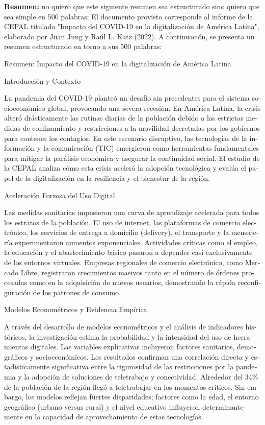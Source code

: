 \documentclass{article}
\begin{document}
\begin{tcolorbox}[colback=brown!8!white,colframe=brown!8!white,boxrule=0pt,arc=2pt,left=4pt,right=4pt,top=3pt,bottom=3pt,before skip=4pt,after skip=4pt]
\begin{otherlanguage}{spanish}
\sffamily\small \textbf{Resumen:} no quiero que este siguiente resumen sea estructurado sino quiero que sea simple en 500 palabras: El documento provisto corresponde al informe de la CEPAL titulado "Impacto del COVID-19 en la digitalización de América Latina", elaborado por Juan Jung y Raúl L. Katz (2022). A continuación, se presenta un resumen estructurado en torno a sus 500 palabras:

Resumen: Impacto del COVID-19 en la digitalización de América Latina

Introducción y Contexto

La pandemia del COVID-19 planteó un desafío sin precedentes para el sistema socioeconómico global, provocando una severa recesión. En América Latina, la crisis alteró drásticamente las rutinas diarias de la población debido a las estrictas medidas de confinamiento y restricciones a la movilidad decretadas por los gobiernos para contener los contagios. En este escenario disruptivo, las tecnologías de la información y la comunicación (TIC) emergieron como herramientas fundamentales para mitigar la parálisis económica y asegurar la continuidad social. El estudio de la CEPAL analiza cómo esta crisis aceleró la adopción tecnológica y evalúa el papel de la digitalización en la resiliencia y el bienestar de la región.

Aceleración Forzosa del Uso Digital

Las medidas sanitarias impusieron una curva de aprendizaje acelerada para todos los estratos de la población. El uso de internet, las plataformas de comercio electrónico, los servicios de entrega a domicilio (delivery), el transporte y la mensajería experimentaron aumentos exponenciales. Actividades críticas como el empleo, la educación y el abastecimiento básico pasaron a depender casi exclusivamente de los entornos virtuales. Empresas regionales de comercio electrónico, como Mercado Libre, registraron crecimientos masivos tanto en el número de órdenes procesadas como en la adquisición de nuevos usuarios, demostrando la rápida reconfiguración de los patrones de consumo.

Modelos Econométricos y Evidencia Empírica

A través del desarrollo de modelos econométricos y el análisis de indicadores históricos, la investigación estima la probabilidad y la intensidad del uso de herramientas digitales. Las variables explicativas incluyeron factores sanitarios, demográficos y socioeconómicos. Los resultados confirman una correlación directa y estadísticamente significativa entre la rigurosidad de las restricciones por la pandemia y la adopción de soluciones de teletrabajo y conectividad. Alrededor del 34\% de la población de la región llegó a teletrabajar en los momentos críticos. Sin embargo, los modelos reflejan fuertes disparidades; factores como la edad, el entorno geográfico (urbano versus rural) y el nivel educativo influyeron determinantemente en la capacidad de aprovechamiento de estas tecnologías.


\end{otherlanguage}
\end{tcolorbox}
\end{document}
